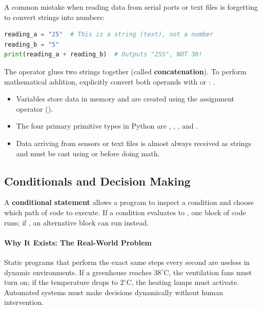 \begin{warning}
A common mistake when reading data from serial ports or text files is forgetting to convert strings into numbers:
\begin{lstlisting}[language=Python]
reading_a = "25"  # This is a string (text), not a number
reading_b = "5"
print(reading_a + reading_b)  # Outputs "255", NOT 30!
\end{lstlisting}
The \code{+} operator glues two strings together (called \textbf{concatenation}). To perform mathematical addition, explicitly convert both operands with  or : .
\end{warning}

\begin{takeaways}
\begin{itemize}
    \item Variables store data in memory and are created using the assignment operator (\code{=}).
    \item The four primary primitive types in Python are , , , and .
    \item Data arriving from sensors or text files is almost always received as strings and must be cast using  or  before doing math.
\end{itemize}
\end{takeaways}

\subsection{Conditionals and Decision Making}

\begin{keyidea}
A \textbf{conditional statement} allows a program to inspect a condition and choose which path of code to execute. If a condition evaluates to , one block of code runs; if , an alternative block can run instead.
\end{keyidea}

\paragraph{Why It Exists: The Real-World Problem}
Static programs that perform the exact same steps every second are useless in dynamic environments. If a greenhouse reaches $38^\circ\text{C}$, the ventilation fans must turn on; if the temperature drops to $2^\circ\text{C}$, the heating lamps must activate. Automated systems must make decisions dynamically without human intervention.

